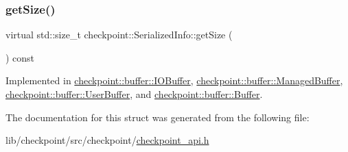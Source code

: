\subsubsection{\texorpdfstring{get\+Size()}{getSize()}}
{\footnotesize\ttfamily virtual std\+::size\+\_\+t checkpoint\+::\+Serialized\+Info\+::get\+Size (\begin{DoxyParamCaption}{ }\end{DoxyParamCaption}) const\hspace{0.3cm}{\ttfamily [pure virtual]}}



Implemented in \hyperlink{structcheckpoint_1_1buffer_1_1_i_o_buffer_a65774dab5b6397ae40b77282729fde2f}{checkpoint\+::buffer\+::\+I\+O\+Buffer}, \hyperlink{structcheckpoint_1_1buffer_1_1_managed_buffer_a26f85bcd885624b7c0ad6fd8572ad466}{checkpoint\+::buffer\+::\+Managed\+Buffer}, \hyperlink{structcheckpoint_1_1buffer_1_1_user_buffer_a434e7feda041957509ee08791d3f4949}{checkpoint\+::buffer\+::\+User\+Buffer}, and \hyperlink{structcheckpoint_1_1buffer_1_1_buffer_a4d78cd3d4ab338bab7911fac4fe9434d}{checkpoint\+::buffer\+::\+Buffer}.



The documentation for this struct was generated from the following file\+:\begin{DoxyCompactItemize}
\item 
lib/checkpoint/src/checkpoint/\hyperlink{checkpoint__api_8h}{checkpoint\+\_\+api.\+h}\end{DoxyCompactItemize}
